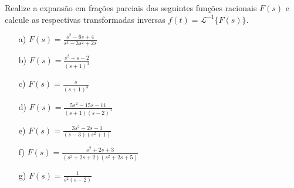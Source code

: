 \begin{Exercise}{\label{frac_parciais}} Realize a expansão em frações parciais das seguintes funções racionais $F(s)$ e calcule as respectivas transformadas inversas $f(t)=\mathcal{L}^{-1}\{F(s)\}$.
\begin{itemize}
\item[a)]$F(s)=\frac{s^2-6s+4}{s^3-3s^2+2s}$
\item[b)]$F(s)=\frac{s^2+s-2}{(s+1)^3}$
\item[c)]$F(s)=\frac{s}{(s+1)^3}$
\item[d)]$F(s)=\frac{5s^2-15s-11}{(s+1)(s-2)^3}$
\item[e)]$F(s)=\frac{3s^2-2s-1}{(s-3)(s^2+1)}$
\item[f)]$F(s)=\frac{s^2+2s+3}{(s^2+2s+2)(s^2+2s+5)}$
\item[g)]$F(s)=\frac{1}{s^2(s-2)}$
\end{itemize}
\end{Exercise}



%